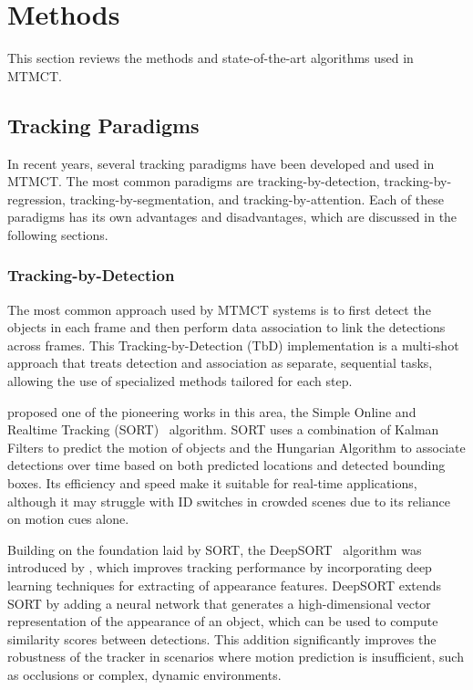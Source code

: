 \section{Methods}\label{sec:methods}
This section reviews the methods and state-of-the-art algorithms used in MTMCT.

\subsection{Tracking Paradigms}\label{subsec:tracking_paradigms}
In recent years, several tracking paradigms have been developed and used in MTMCT. The most common paradigms are tracking-by-detection, tracking-by-regression, tracking-by-segmentation, and tracking-by-attention. Each of these paradigms has its own advantages and disadvantages, which are discussed in the following sections.

\subsubsection{Tracking-by-Detection}\label{subsubsec:tracking-by-detection}
The most common approach used by MTMCT systems is to first detect the objects in each frame and then perform data association to link the detections across frames. This Tracking-by-Detection (TbD) implementation is a multi-shot approach that treats detection and association as separate, sequential tasks, allowing the use of specialized methods tailored for each step.

\citeauthor{Bewley16} proposed one of the pioneering works in this area, the Simple Online and Realtime Tracking (SORT)~\cite{Bewley16} algorithm. SORT uses a combination of Kalman Filters to predict the motion of objects and the Hungarian Algorithm to associate detections over time based on both predicted locations and detected bounding boxes. Its efficiency and speed make it suitable for real-time applications, although it may struggle with ID switches in crowded scenes due to its reliance on motion cues alone.

Building on the foundation laid by SORT, the DeepSORT~\cite{Wojke17} algorithm was introduced by \citeauthor{Wojke17}, which improves tracking performance by incorporating deep learning techniques for extracting of appearance features. DeepSORT extends SORT by adding a neural network that generates a high-dimensional vector representation of the appearance of an object, which can be used to compute similarity scores between detections. This addition significantly improves the robustness of the tracker in scenarios where motion prediction is insufficient, such as occlusions or complex, dynamic environments.


